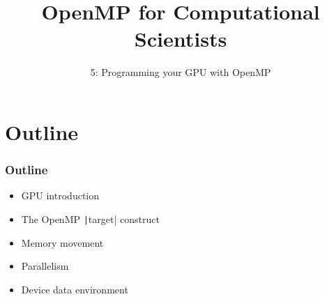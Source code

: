 \documentclass[aspectratio=169]{beamer}
\title{OpenMP for Computational Scientists}
\subtitle{5: Programming your GPU with OpenMP}
\begin{document}
\frame{\titlepage}

\section{Outline}
\begin{frame}
\frametitle{Outline}


\begin{itemize}
  \item GPU introduction
  \item The OpenMP \texttt|target| construct
  \item Memory movement
  \item Parallelism
  \item Device data environment
\end{itemize}
\end{frame}





\end{document}
